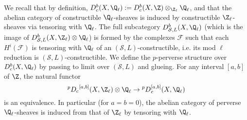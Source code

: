 We recall that by definition, $D^b_c(X,\Q_\ell):=D^b_c(X,\Z)\otimes_{\Z_\ell}\Q_\ell$, and that the abelian category of constructible $\Q_\ell$-sheaves is induced by constructible $\Z_\ell$-sheaves via tensoring with $\Q_\ell$. The full subcategory $D^b_{\mathcal{S},L}(X,\Q_\ell)$ (which is the image of $D^b_{\mathcal{S},L}(X,\Z_\ell)\otimes\Q_\ell$) is formed by the complexes $\mathscr{F}$ such that each $H^i(\mathscr{F})$ is tensoring with $\Q_\ell$ of an $(\mathcal{S},L)$-constructible, i.e. its mod $\ell$ reduction is $(\mathcal{S},L)$-constructible. We define the $p$-perverse structure over $D^b_c(X,\Q_\ell)$ by passing to limit over $(\mathcal{S},L)$ and glueing. For any interval $[a,b]$ of $\Z$, the natural functor
\[{^pD_c}^{[a,b]}(X,\Z_\ell)\otimes\Q_\ell\to {^pD}_c^{[a,b]}(X,\Q_\ell)\]
is an equivalence. In particular (for $a=b=0$), the abelian category of perverse $\Q_\ell$-sheaves is induced from that of $\Z_\ell$ by tensoring with $\Q_\ell$.\par

